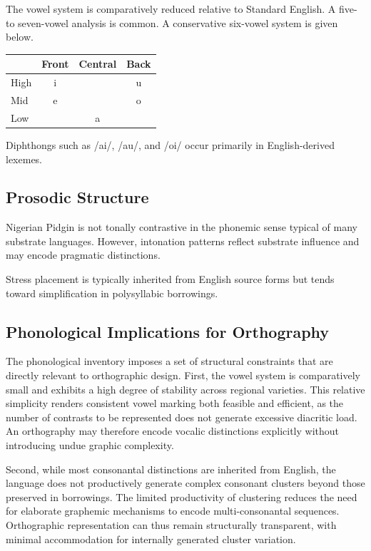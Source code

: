 \documentclass[12pt]{article}
\begin{document}
The vowel system is comparatively reduced relative to Standard English. A five- to seven-vowel analysis is common. A conservative six-vowel system is given below.

\begin{center}
\begin{tabular}{lccc}
 & Front & Central & Back \\ \hline
High & i &  & u \\
Mid & e &  & o \\
Low &  & a &  \\
\end{tabular}
\end{center}

Diphthongs such as /ai/, /au/, and /oi/ occur primarily in English-derived lexemes.

\subsection{Prosodic Structure}

Nigerian Pidgin is not tonally contrastive in the phonemic sense typical of many substrate languages. However, intonation patterns reflect substrate influence and may encode pragmatic distinctions.

Stress placement is typically inherited from English source forms but tends toward simplification in polysyllabic borrowings.

\subsection{Phonological Implications for Orthography}

The phonological inventory imposes a set of structural constraints that are directly relevant to orthographic design. First, the vowel system is comparatively small and exhibits a high degree of stability across regional varieties. This relative simplicity renders consistent vowel marking both feasible and efficient, as the number of contrasts to be represented does not generate excessive diacritic load. An orthography may therefore encode vocalic distinctions explicitly without introducing undue graphic complexity.

Second, while most consonantal distinctions are inherited from English, the language does not productively generate complex consonant clusters beyond those preserved in borrowings. The limited productivity of clustering reduces the need for elaborate graphemic mechanisms to encode multi-consonantal sequences. Orthographic representation can thus remain structurally transparent, with minimal accommodation for internally generated cluster variation.
\end{document}
